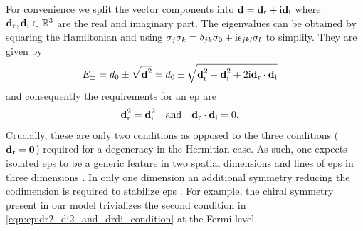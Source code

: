 For convenience we split the vector components into $\textbf{d} = \textbf{d}_{\text{r}} + \text{i} \textbf{d}_{\text{i}}$ where $\textbf{d}_{\text{r}}, \textbf{d}_{\text{i}}\in\mathbb{R}^3$ are the real and imaginary part.
The eigenvalues can be obtained by squaring the Hamiltonian and using $\sigma_j\sigma_k = \delta_{jk}\sigma_0 + \text{i}\epsilon_{jkl} \sigma_l$ to simplify.
They are given by
\begin{align}
E_\pm &= d_0 \pm \sqrt{\textbf{d}^2} = d_0 \pm \sqrt{\textbf{d}_{\text{r}}^2 - \textbf{d}_{\text{i}}^2 + 2\text{i} \textbf{d}_{\text{r}} \cdot \textbf{d}_{\text{i}}} \label{eqn:ep:eigvals_of_d}
\end{align}
and consequently the requirements for an \gls{ep} are \cite{NHT_SymmetryProtectedNodalPhases_Budich_2019}
\begin{align}
\textbf{d}_{\text{r}}^2 &= \textbf{d}_{\text{i}}^2 \quad\text{and}\quad \textbf{d}_{\text{r}} \cdot \textbf{d}_{\text{i}} = 0. \label{eqn:ep:dr2_di2_and_drdi_condition}
\end{align}
Crucially, these are only two conditions as opposed to the three conditions ($\textbf{d}_{\text{r}} = \textbf{0}$) required for a degeneracy in the Hermitian case.
As such, one expects isolated \glspl{ep} to be a generic feature in two spatial dimensions and lines of \glspl{ep} in three dimensions \cite{ExceptTop_RevModPhys.93.015005}.
In only one dimension an additional symmetry reducing the codimension is required to stabilize \glspl{ep} \cite{NHT_SymmetryProtectedNodalPhases_Budich_2019,NHT_SymmetryProtectedExceptRings_Chiral_Yoshida_2019,EP_DynamicInduced_Quenched_Lehmann_2021}.
For example, the chiral symmetry present in our model trivializes the second condition in \autoref{eqn:ep:dr2_di2_and_drdi_condition} at the Fermi level.